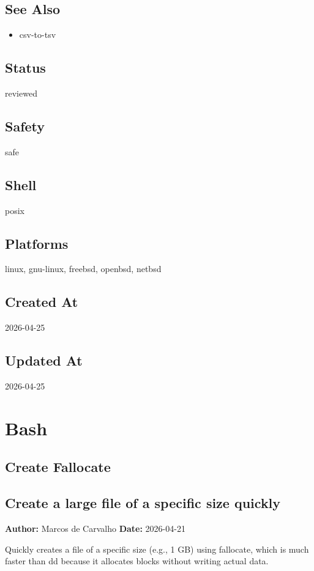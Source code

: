 \documentclass[openany]{book}
\begin{document}
\section*{See Also}
\begin{itemize}
  \item csv-to-tsv
\end{itemize}

\section*{Status}
reviewed

\section*{Safety}
safe

\section*{Shell}
posix

\section*{Platforms}
linux, gnu-linux, freebsd, openbsd, netbsd

\section*{Created At}
2026-04-25

\section*{Updated At}
2026-04-25

\chapter{Bash}

\section{Create Fallocate}
\section*{Create a large file of a specific size quickly}
\textbf{Author:} Marcos de Carvalho \hfill \textbf{Date:} 2026-04-21

\noindent Quickly creates a file of a specific size (e.g., 1 GB) using fallocate, which is much faster than dd because it allocates blocks without writing actual data.
\end{document}

